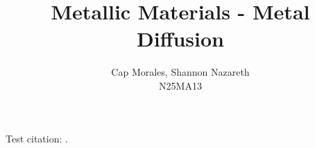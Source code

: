 \documentclass[12]{article}
\begin{document}
 

\title{Metallic Materials - Metal Diffusion}
\author{Cap Morales, Shannon Nazareth\\
N25MA13}

\maketitle


Test citation: \citep{diff}. %
%
%
%
%
\nocite{*}

 


\end{document}
